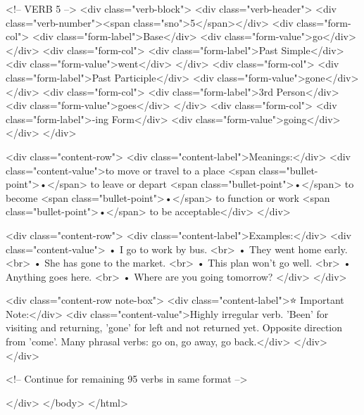         <!-- VERB 5 -->
        <div class="verb-block">
            <div class="verb-header">
                <div class="verb-number"><span class="sno">5</span></div>
                <div class="form-col">
                    <div class="form-label">Base</div>
                    <div class="form-value">go</div>
                </div>
                <div class="form-col">
                    <div class="form-label">Past Simple</div>
                    <div class="form-value">went</div>
                </div>
                <div class="form-col">
                    <div class="form-label">Past Participle</div>
                    <div class="form-value">gone</div>
                </div>
                <div class="form-col">
                    <div class="form-label">3rd Person</div>
                    <div class="form-value">goes</div>
                </div>
                <div class="form-col">
                    <div class="form-label">-ing Form</div>
                    <div class="form-value">going</div>
                </div>
            </div>
            
            <div class="content-row">
                <div class="content-label">Meanings:</div>
                <div class="content-value">to move or travel to a place <span class="bullet-point">•</span> to leave or depart <span class="bullet-point">•</span> to become <span class="bullet-point">•</span> to function or work <span class="bullet-point">•</span> to be acceptable</div>
            </div>
            
            <div class="content-row">
                <div class="content-label">Examples:</div>
                <div class="content-value">
                    • I go to work by bus. <br>
                    • They went home early. <br>
                    • She has gone to the market. <br>
                    • This plan won't go well. <br>
                    • Anything goes here. <br>
                    • Where are you going tomorrow?
                </div>
            </div>
            
            <div class="content-row note-box">
                <div class="content-label">⭐ Important Note:</div>
                <div class="content-value">Highly irregular verb. 'Been' for visiting and returning, 'gone' for left and not returned yet. Opposite direction from 'come'. Many phrasal verbs: go on, go away, go back.</div>
            </div>
        </div>
        
        <!-- Continue for remaining 95 verbs in same format -->
        
    </div>
</body>
</html>